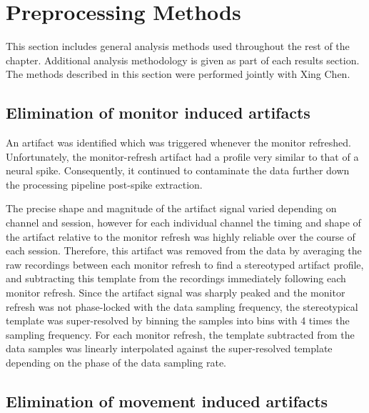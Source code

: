 \FloatBarrier
\section{Preprocessing Methods}
\label{sec:pl_preprocessing}

This section includes general analysis methods used throughout the rest of the chapter.
Additional analysis methodology is given as part of each results section.
The methods described in this section were performed jointly with Xing Chen.


\subsection{Elimination of monitor induced artifacts}
\label{sec:pl_artifact_elimination}
\label{sec:ma}

An artifact was identified which was triggered whenever the monitor refreshed.
Unfortunately, the monitor-refresh artifact had a profile very similar to that of a neural spike.
Consequently, it continued to contaminate the data further down the processing pipeline post-spike extraction.

The precise shape and magnitude of the artifact signal varied depending on channel and session, however for each individual channel the timing and shape of the artifact relative to the monitor refresh was highly reliable over the course of each session.
Therefore, this artifact was removed from the data by averaging the raw recordings between each monitor refresh to find a stereotyped artifact profile, and subtracting this template from the recordings immediately following each monitor refresh.
Since the artifact signal was sharply peaked and the monitor refresh was not phase-locked with the data sampling frequency, the stereotypical template was super-resolved by binning the samples into bins with 4 times the sampling frequency.
For each monitor refresh, the template subtracted from the data samples was linearly interpolated against the super-resolved template depending on the phase of the data sampling rate.


\subsection{Elimination of movement induced artifacts}
\label{sec:pl_movement_artifact}


